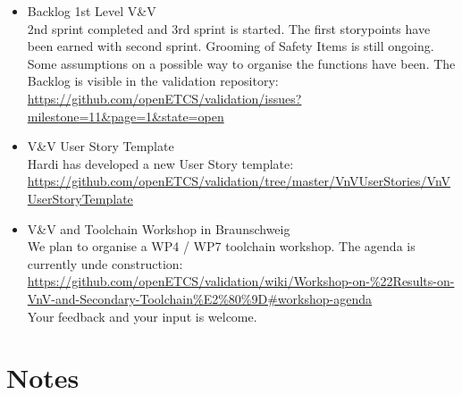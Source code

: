 \documentclass[a4paper, 11pt]{article}
\begin{document}
\begin{itemize}
\item Backlog 1st Level V\&V\\
2nd sprint completed and 3rd sprint is started. The first storypoints have been earned with second sprint.
Grooming of Safety Items is still ongoing. Some assumptions on a possible way to organise the functions have been.
The Backlog is visible in the validation repository:
\url{https://github.com/openETCS/validation/issues?milestone=11&page=1&state=open}
\item V\&V User Story Template\\
Hardi has developed a new User Story template:\\
\url{https://github.com/openETCS/validation/tree/master/VnVUserStories/VnVUserStoryTemplate}\\
\item V\&V and Toolchain Workshop in Braunschweig\\
We plan to organise a WP4 / WP7 toolchain workshop. The agenda is currently unde construction:\\
\url{https://github.com/openETCS/validation/wiki/Workshop-on-%22Results-on-VnV-and-Secondary-Toolchain%E2%80%9D#workshop-agenda}\\
Your feedback and your input is welcome.
\end{itemize}


\section{Notes}
\end{document}
